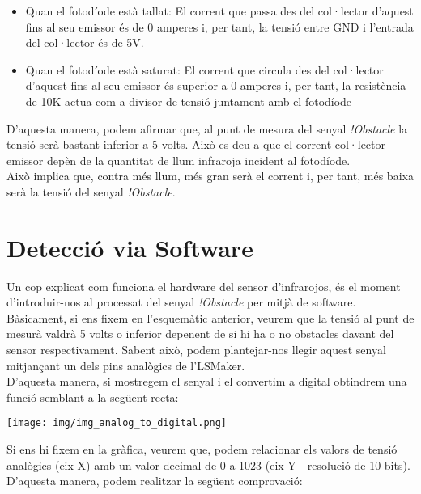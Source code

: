 \documentclass[fleqn,10pt]{SelfArx} %
\begin{document}
\begin{itemize}

	\item Quan el fotodíode està tallat: El corrent que passa des del col·lector d'aquest fins al seu emissor és de 0 amperes i, per tant, la tensió entre GND i l’entrada del col·lector és de 5V.

	\item Quan el fotodíode està saturat: El corrent que circula des del col·lector d'aquest fins al seu emissor és superior a 0 amperes i, per tant, la resistència de 10K actua com a divisor de tensió juntament amb el fotodíode

\end{itemize}

D’aquesta manera, podem afirmar que, al punt de mesura del senyal \textit{!Obstacle} la tensió serà bastant inferior a 5 volts. Això es deu a que el corrent col·lector-emissor depèn de la quantitat de llum infraroja incident al fotodíode.\\

Això implica que, contra més llum, més gran
serà el corrent i, per tant, més baixa serà la tensió del senyal \textit{!Obstacle}.



\section{Detecció via Software}
Un cop explicat com funciona el hardware del sensor d'infrarojos, és el moment d'introduir-nos al processat del senyal \textit{!Obstacle} per mitjà de software.\\

Bàsicament, si ens fixem en l'esquemàtic anterior, veurem que la tensió al punt de mesurà valdrà 5 volts o inferior depenent de si hi ha o no obstacles davant del sensor respectivament. Sabent això, podem plantejar-nos llegir aquest senyal mitjançant un dels pins analògics de l'LSMaker.\\

D'aquesta manera, si mostregem el senyal i el convertim a digital obtindrem una funció semblant a la següent recta:

\begin{center}
\texttt{[image: img/img\_analog\_to\_digital.png]}
\end{center}

Si ens hi fixem en la gràfica, veurem que, podem relacionar els valors de tensió analògics (eix X) amb un valor decimal de 0 a 1023 (eix Y - resolució de 10 bits). D’aquesta manera, podem realitzar la següent comprovació:
\end{document}
